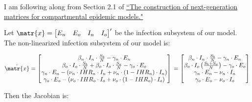 \documentclass[11pt]{article}
\begin{document}
I am following along from Section 2.1 of \href{https://paperpile.com/app/p/3ac94d2d-a793-030e-b8a5-93733f228342}{``The construction of next-generation matrices for compartmental epidemic models."}

Let \( \matr{x} = \begin{bmatrix} E_n & E_o & I_n & I_o \end{bmatrix}^\prime \) be the infection subsystem of our model.
The non-linearized infection subsystem of our model is:



\[
	\dot{\matr{x}}	=
	\begin{bmatrix}
		\beta_n \cdot I_n \cdot \frac{S_b}{N} - \gamma_n \cdot E_n\\
		\beta_o \cdot I_o \cdot \frac{S_b}{N} + \beta_o \cdot I_o \cdot \frac{S_o}{N} - \gamma_o \cdot E_o\\
		\gamma_n \cdot E_n - (\nu_n \cdot IHR_n \cdot I_n + \nu_n \cdot (1 - IHR_n) \cdot I_n)\\
		\gamma_o \cdot E_o - (\nu_o \cdot IHR_o \cdot I_o + \nu_o \cdot (1 - IHR_o) \cdot I_o)
	 \end{bmatrix}\\
	 =
	 \begin{bmatrix}
	 	\beta_n \cdot I_n \cdot \frac{S_b}{N} - \gamma_n \cdot E_n\\
		\beta_o \cdot I_o \left( \frac{S_b + S_o}{N} \right) - \gamma_o \cdot E_o\\
		\gamma_n \cdot E_n - \nu_n \cdot I_n\\
		\gamma_o \cdot E_o - \nu_o \cdot I_o
	 \end{bmatrix}
\]

Then the Jacobian is:
\end{document}
